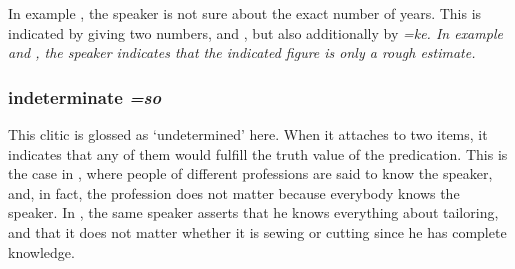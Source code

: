 In   example , the speaker is not sure about the exact number of years. This is indicated by giving two numbers,  and , but also additionally by \em =ke\em. In example  and , the speaker indicates that the indicated figure is only a rough estimate.

\subsubsection{indeterminate \em =so\em}\label{sec:morph:=so}
This clitic is glossed as `undetermined' here. When it attaches to two items, it indicates that any of them would fulfill the truth value of the predication. This is the case in , where people of different professions are said to know the speaker, and, in fact, the profession does not matter because everybody knows the speaker. In , the same speaker asserts that he knows everything about tailoring, and that it does not matter whether it is sewing or cutting since he has complete knowledge.





